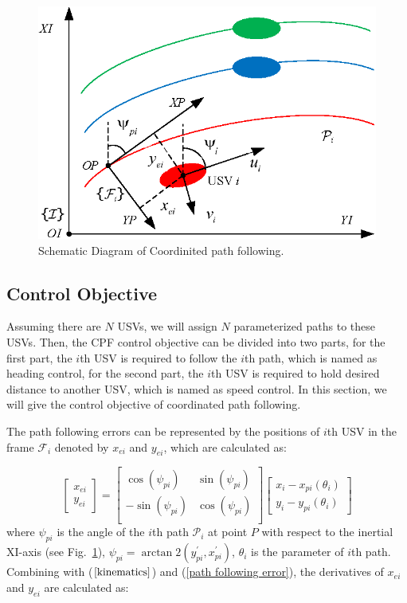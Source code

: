 \documentclass[english]{cccconf}
\begin{document}
\begin{figure}[!htb]
	\centering
	\includegraphics[width=\hsize]{CPF.eps}
	\caption{Schematic Diagram of Coordinited path following. }
	\label{CPF}
\end{figure}

\subsection{Control Objective}

Assuming there are $N$ USVs, we will assign $N$ parameterized paths to these USVs. Then, the CPF control objective can be divided into two parts, for the first part, the $i$th USV is required to follow the $i$th path, which is named as heading control, for the second part, the $i$th USV is required to hold desired distance to another USV, which is named as speed control. In this section, we will give the control objective of coordinated path following.

The path following errors can be represented by the positions of $i$th USV in the frame $\mathcal{F}_i$ denoted by $x_{ei}$ and $y_{ei}$, which are calculated as:

\begin{equation}\label{path following error}
	\begin{bmatrix}
		x_{ei} \\ y_{ei}
	\end{bmatrix}=
	\begin{bmatrix}
		\cos(\psi_{pi}) & \sin(\psi_{pi})\\
		-\sin(\psi_{pi}) & \cos(\psi_{pi})\\
	\end{bmatrix}
	\begin{bmatrix}
		x_i-x_{pi}(\theta_i) \\ y_i-y_{pi}(\theta_i)
	\end{bmatrix}
\end{equation}
where $\psi_{pi}$ is the angle of the $i$th path $\mathcal{P}_i$ at point $P$ with respect to the inertial XI-axis (see Fig.~\ref{CPF}), $\psi_{pi}=\arctan2(y^{'}_{pi},x^{'}_{pi})$, $\theta_i$ is the parameter of $i$th path. Combining with ($\ref{kinematics}$) and (\ref{path following error}), the derivatives of $x_{ei}$ and $y_{ei}$ are calculated as:
\end{document}

